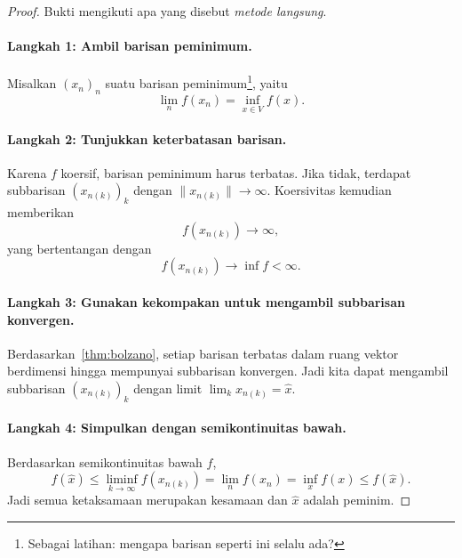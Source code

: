 \begin{proof}
    Bukti mengikuti apa yang disebut \emph{metode langsung}.

    \paragraph{Langkah 1: Ambil barisan peminimum.}
    Misalkan $(x_n)_n$ suatu barisan peminimum\footnote{Sebagai latihan:
    mengapa barisan seperti ini selalu ada?}, yaitu
    \begin{equation}
        \lim_n f(x_n)=\inf_{x\in V}f(x).
    \end{equation}

    \paragraph{Langkah 2: Tunjukkan keterbatasan barisan.}
    Karena $f$ koersif, barisan peminimum harus terbatas. Jika tidak, terdapat
    subbarisan $(x_{n(k)})_k$ dengan $\|x_{n(k)}\|\rightarrow\infty$.
    Koersivitas kemudian memberikan
    \begin{equation}
        f(x_{n(k)})\rightarrow\infty,
    \end{equation}
    yang bertentangan dengan
    \begin{equation}
        f(x_{n(k)})\rightarrow\inf f<\infty.
    \end{equation}

    \paragraph{Langkah 3: Gunakan kekompakan untuk mengambil subbarisan
    konvergen.}
    Berdasarkan~\cref{thm:bolzano}, setiap barisan terbatas dalam ruang vektor
    berdimensi hingga mempunyai subbarisan konvergen. Jadi kita dapat mengambil
    subbarisan $(x_{n(k)})_k$ dengan limit
    $\lim_kx_{n(k)}=\hat x$.

    \paragraph{Langkah 4: Simpulkan dengan semikontinuitas bawah.}
    Berdasarkan semikontinuitas bawah $f$,
    \begin{equation}
        f(\hat x)
        \leq\liminf_{k\rightarrow\infty}f(x_{n(k)})
        =\lim_n f(x_n)
        =\inf_x f(x)
        \leq f(\hat x).
    \end{equation}
    Jadi semua ketaksamaan merupakan kesamaan dan $\hat x$ adalah peminim.
\end{proof}
